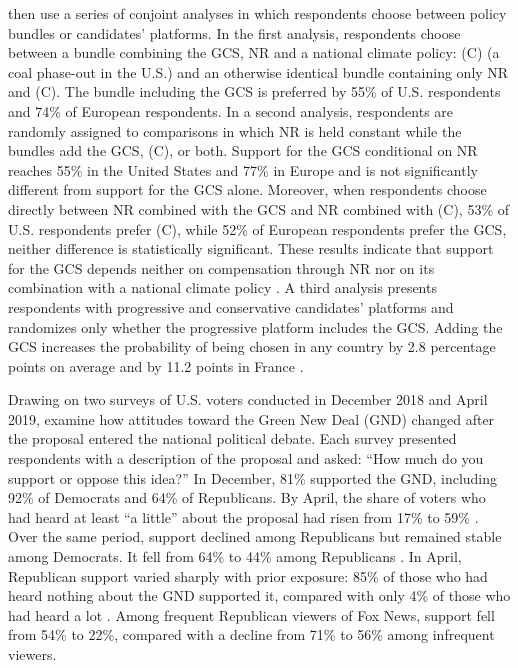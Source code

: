 \documentclass[11pt,a4paper]{article}
\begin{document}
\citet{fabre_majority_2025} then use a series of conjoint analyses in which respondents choose between policy bundles or candidates' platforms. In the first analysis, respondents choose between a bundle combining the GCS, NR and a national climate policy: (C) (a coal phase-out in the U.S.) and an otherwise identical bundle containing only NR and (C). The bundle including the GCS is preferred by 55\% of U.S. respondents and 74\% of European respondents. 
In a second analysis, respondents are randomly assigned to comparisons in which NR is held constant while the bundles add the GCS, (C), or both. Support for the GCS conditional on NR reaches 55\% in the United States and 77\% in Europe and is not significantly different from support for the GCS alone. Moreover, when respondents choose directly between NR combined with the GCS and NR combined with (C), 53\% of U.S. respondents prefer (C), while 52\% of European respondents prefer the GCS, neither difference is statistically significant. These results indicate that support for the GCS depends neither on compensation through NR nor on its combination with a national climate policy \citep[Figure S8]{fabre_majority_2025}. 
A third analysis presents respondents with progressive and conservative candidates' platforms and randomizes only whether the progressive platform includes the GCS. Adding the GCS increases the probability of being chosen in any country by 2.8 percentage points on average and by 11.2 points in France \citep[Supplementary Table 2]{fabre_majority_2025}.


Drawing on two surveys of U.S. voters conducted in December 2018 and April 2019, \citet{gustafson_development_2019} examine how attitudes toward the Green New Deal (GND) changed after the proposal entered the national political debate. Each survey presented respondents with a description of the proposal and asked: ``How much do you support or oppose this idea?'' In December, 81\% supported the GND, including 92\% of Democrats and 64\% of Republicans. By April, the share of voters who had heard at least ``a little'' about the proposal had risen from 17\% to 59\% \citep[Figure 1]{gustafson_development_2019}. Over the same period, support declined among Republicans but remained stable among Democrats. It fell from 64\% to 44\% among Republicans \citep[Figure 2]{gustafson_development_2019}. 
In April, Republican support varied sharply with prior exposure: 85\% of those who had heard nothing about the GND supported it, compared with only 4\% of those who had heard a lot \citep[Figure 3]{gustafson_development_2019}. Among frequent Republican viewers of Fox News, support fell from 54\% to 22\%, compared with a decline from 71\% to 56\% among infrequent viewers. 
\end{document}
